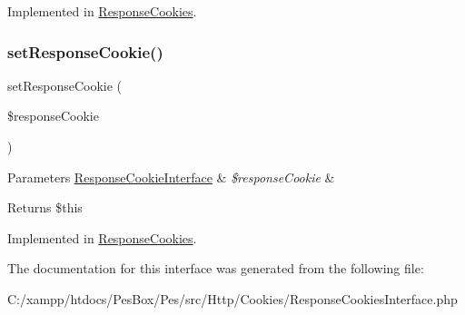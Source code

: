 Implemented in \mbox{\hyperlink{class_pes_1_1_http_1_1_cookies_1_1_response_cookies_a462328426f473092af4994841a3bb3de}{Response\+Cookies}}.

\mbox{\label{interface_pes_1_1_http_1_1_cookies_1_1_response_cookies_interface_a89be510b0aef08eb7545bf1215f39202}} 
\subsubsection{\texorpdfstring{set\+Response\+Cookie()}{setResponseCookie()}}
{\footnotesize\ttfamily set\+Response\+Cookie (\begin{DoxyParamCaption}\item[{\mbox{\hyperlink{interface_pes_1_1_http_1_1_cookies_1_1_response_cookie_interface}{Response\+Cookie\+Interface}}}]{\$response\+Cookie }\end{DoxyParamCaption})}


\begin{DoxyParams}[1]{Parameters}
\mbox{\hyperlink{interface_pes_1_1_http_1_1_cookies_1_1_response_cookie_interface}{Response\+Cookie\+Interface}} & {\em \$response\+Cookie} & \\
\hline
\end{DoxyParams}
\begin{DoxyReturn}{Returns}
\$this 
\end{DoxyReturn}


Implemented in \mbox{\hyperlink{class_pes_1_1_http_1_1_cookies_1_1_response_cookies_a3eb38fba7bb5b61b9a0e4b4887168ff7}{Response\+Cookies}}.



The documentation for this interface was generated from the following file\+:\begin{DoxyCompactItemize}
\item 
C\+:/xampp/htdocs/\+Pes\+Box/\+Pes/src/\+Http/\+Cookies/Response\+Cookies\+Interface.\+php\end{DoxyCompactItemize}
